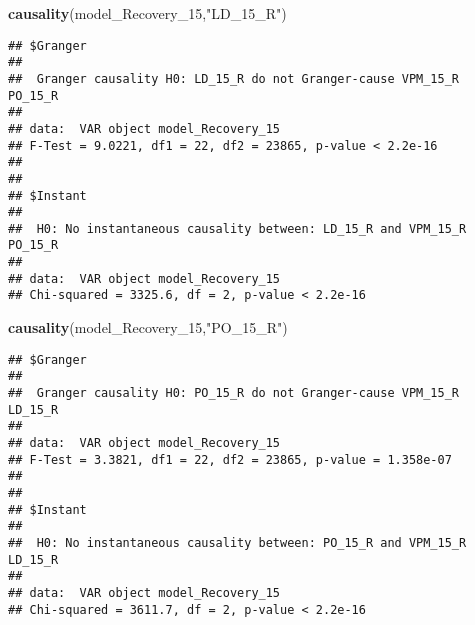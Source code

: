 \documentclass[
]{article}
\newenvironment{Shaded}{\begin{snugshade}}{\end{snugshade}}
\newcommand{\FunctionTok}[1]{\textcolor[rgb]{0.13,0.29,0.53}{\textbf{#1}}}
\newcommand{\NormalTok}[1]{#1}
\newcommand{\StringTok}[1]{\textcolor[rgb]{0.31,0.60,0.02}{#1}}
\begin{document}
\begin{Shaded}
\begin{Highlighting}[]
\FunctionTok{causality}\NormalTok{(model\_Recovery\_15,}\StringTok{"LD\_15\_R"}\NormalTok{)}
\end{Highlighting}
\end{Shaded}

\begin{verbatim}
## $Granger
## 
##  Granger causality H0: LD_15_R do not Granger-cause VPM_15_R PO_15_R
## 
## data:  VAR object model_Recovery_15
## F-Test = 9.0221, df1 = 22, df2 = 23865, p-value < 2.2e-16
## 
## 
## $Instant
## 
##  H0: No instantaneous causality between: LD_15_R and VPM_15_R PO_15_R
## 
## data:  VAR object model_Recovery_15
## Chi-squared = 3325.6, df = 2, p-value < 2.2e-16
\end{verbatim}

\begin{Shaded}
\begin{Highlighting}[]
\FunctionTok{causality}\NormalTok{(model\_Recovery\_15,}\StringTok{"PO\_15\_R"}\NormalTok{)}
\end{Highlighting}
\end{Shaded}

\begin{verbatim}
## $Granger
## 
##  Granger causality H0: PO_15_R do not Granger-cause VPM_15_R LD_15_R
## 
## data:  VAR object model_Recovery_15
## F-Test = 3.3821, df1 = 22, df2 = 23865, p-value = 1.358e-07
## 
## 
## $Instant
## 
##  H0: No instantaneous causality between: PO_15_R and VPM_15_R LD_15_R
## 
## data:  VAR object model_Recovery_15
## Chi-squared = 3611.7, df = 2, p-value < 2.2e-16
\end{verbatim}
\end{document}
